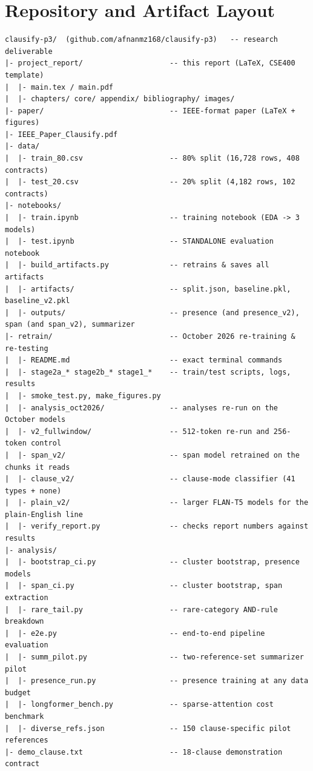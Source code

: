\chapter{Repository and Artifact Layout}
\label{app:repo}

{\scriptsize
\begin{verbatim}
clausify-p3/  (github.com/afnanmz168/clausify-p3)   -- research deliverable
|- project_report/                    -- this report (LaTeX, CSE400 template)
|  |- main.tex / main.pdf
|  |- chapters/ core/ appendix/ bibliography/ images/
|- paper/                             -- IEEE-format paper (LaTeX + figures)
|- IEEE_Paper_Clausify.pdf
|- data/
|  |- train_80.csv                    -- 80% split (16,728 rows, 408 contracts)
|  |- test_20.csv                     -- 20% split (4,182 rows, 102 contracts)
|- notebooks/
|  |- train.ipynb                     -- training notebook (EDA -> 3 models)
|  |- test.ipynb                      -- STANDALONE evaluation notebook
|  |- build_artifacts.py              -- retrains & saves all artifacts
|  |- artifacts/                      -- split.json, baseline.pkl, baseline_v2.pkl
|  |- outputs/                        -- presence (and presence_v2), span (and span_v2), summarizer
|- retrain/                           -- October 2026 re-training & re-testing
|  |- README.md                       -- exact terminal commands
|  |- stage2a_* stage2b_* stage1_*    -- train/test scripts, logs, results
|  |- smoke_test.py, make_figures.py
|  |- analysis_oct2026/               -- analyses re-run on the October models
|  |- v2_fullwindow/                  -- 512-token re-run and 256-token control
|  |- span_v2/                        -- span model retrained on the chunks it reads
|  |- clause_v2/                      -- clause-mode classifier (41 types + none)
|  |- plain_v2/                       -- larger FLAN-T5 models for the plain-English line
|  |- verify_report.py                -- checks report numbers against results
|- analysis/
|  |- bootstrap_ci.py                 -- cluster bootstrap, presence models
|  |- span_ci.py                      -- cluster bootstrap, span extraction
|  |- rare_tail.py                    -- rare-category AND-rule breakdown
|  |- e2e.py                          -- end-to-end pipeline evaluation
|  |- summ_pilot.py                   -- two-reference-set summarizer pilot
|  |- presence_run.py                 -- presence training at any data budget
|  |- longformer_bench.py             -- sparse-attention cost benchmark
|  |- diverse_refs.json               -- 150 clause-specific pilot references
|- demo_clause.txt                    -- 18-clause demonstration contract


\end{verbatim}}
